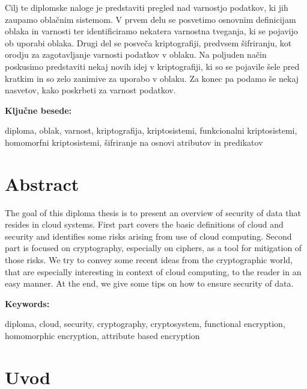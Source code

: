 \documentclass[12pt,a4paper,openany,tikz]{book}
\theoremstyle{plain}
\theoremstyle{definition}
\begin{document}
Cilj te diplomske naloge je predstaviti pregled nad varnostjo podatkov, ki jih zaupamo oblačnim sistemom. V prvem delu se posvetimo osnovnim definicijam oblaka in varnosti ter identificiramo nekatera varnostna tveganja, ki se pojavijo ob uporabi oblaka. Drugi del se posveča kriptografiji, predvsem šifriranju, kot orodju za zagotavljanje varnosti podatkov v oblaku. Na poljuden način poskusimo predstaviti nekaj novih idej v kriptografiji, ki so se pojavile šele pred kratkim in so zelo zanimive za uporabo v oblaku. Za konec pa podamo še nekaj nasvetov, kako poskrbeti za varnost podatkov.

\vspace{1.3cm}
\noindent
{\large \bf Ključne besede:}

\vspace{0.5cm}
\noindent
diploma, oblak, varnost, kriptografija, kriptosistemi, funkcionalni kriptosistemi, homomorfni kriptosistemi, šifriranje na osnovi atributov in predikatov

\chapter*{Abstract}

The goal of this diploma thesis is to present an overview of security of data that resides in cloud systems. First part covers the basic definitions of cloud and security and identifies some risks arising from use of cloud computing. Second part is focused on cryptography, especially on ciphers, as a tool for mitigation of those risks. We try to convey some recent ideas from the cryptographic world, that are especially interesting in context of cloud computing, to the reader in an easy manner. At the end, we give some tips on how to ensure security of data.

\vspace{1.3cm}
\noindent
{\large \bf Keywords:}

\vspace{0.5cm}
\noindent
diploma, cloud, security, cryptography, cryptosystem, functional encryption, homomorphic encryption, attribute based encryption


\mainmatter

\pagestyle{fancy}
\setcounter{page}{1}
\chapter{Uvod}
\end{document}
